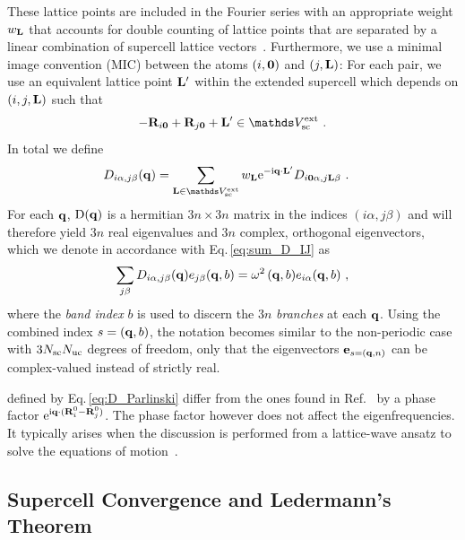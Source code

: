 These lattice points are included in the Fourier series with an appropriate weight $w_{{\bf L}}$ that accounts for double counting of lattice points that are separated by a linear combination of supercell lattice vectors~\cite{Parlinski1997}. Furthermore, we use a minimal image convention (MIC) between the atoms $(i, {\bf 0})$ and $(j, {\bf L})$: For each pair, we use an equivalent lattice point ${\bf L}'$ within the extended supercell which depends on $(i, j, {\bf L})$ such that
\begin{align}
	- \b R_{i \b 0 } + \b R_{j \b 0} + \b L' \in \mathds V_{\rm sc}^{\rm ext}~.
	\label{eq:L'}
\end{align}
In total we define
\begin{align}
	{D}_{i \alpha, j \beta} (\b q) 	
		&= %
		\sum_{\b L \in \mathds V_{\rm sc}^{\rm ext}} 
			w_{\b L}
		{\rm e}^{- \im \b q \cdot \b L'} {D}_{i \b 0 \alpha, j \b L \beta}~.
	\label{eq:D_Parlinski}
\end{align}
For each ${\bf q}$, ${\rm D} ({\bf q})$ is a hermitian $3n \times 3n$ matrix in the indices $(i \alpha, j \beta)$ and will therefore yield $3n$ real eigenvalues and $3n$ complex, orthogonal eigenvectors, which we denote in accordance with Eq.\,\eqref{eq:sum_D_IJ} as
\begin{align}
\sum_{j \beta} {D}_{i \alpha, j \beta} (\b q) e_{j \beta} (\b q , b)
= \omega^2 \, (\b q, b) e_{i \alpha} (\b q , b)~,
\label{eq:D_ij(q)w}
\end{align}
where the \emph{band index} $b$ is used to discern the $3n$ \emph{branches} at each ${\bf q}$. Using the combined index $s = ({\bf q}, b)$, the notation becomes similar to the non-periodic case with $3N_{\rm sc} N_{\rm uc}$ degrees of freedom, only that the eigenvectors ${\bf e}_{s = ({\bf q}, n)}$ can be complex-valued instead of strictly real.

 defined by Eq.\,\eqref{eq:D_Parlinski} differ from the ones found in Ref.~\cite{Parlinski1997} by a phase factor ${\rm e}^{{\rm i} {\bf q} \cdot ({\bf R}_i^0 - {\bf R}_j^0)}$. The phase factor however does not affect the eigenfrequencies. It typically arises when the discussion is performed from a lattice-wave ansatz to solve the equations of motion~\cite[p. 298]{BornHuang}.

\subsection{Supercell Convergence and Ledermann's Theorem}


